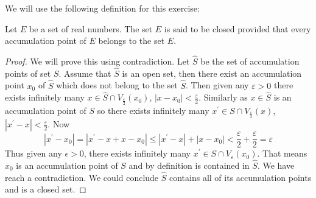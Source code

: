We will use the following definition for this exercise:
\begin{defi} Let \(E\) be a set of real numbers. The set \(E\) is said to be closed provided that every accumulation point of \(E\) belongs to the set \(E\).
\end{defi}
\begin{proof}
We will prove this using contradiction. Let \(\hat{S}\) be the set of accumulation points of set \(S\). Assume that \(\hat{S}\) is an open set, then there exist an accumulation point \(x_{0}\) of \(\hat{S}\) which does not belong to the set \(\hat{S}\). \newline
Then given any \(\varepsilon>0\) there exists infinitely many \(x \in \hat{S} \cap V_{\frac{\varepsilon}{2}}(x_0)\), \(\left|x-x_{0}\right|<\frac{\varepsilon}{2}\). Similarly as \(x \in \hat{S} \) is an accumulation point of \(S\) so there exists infinitely many \(x^{\prime} \in S \cap V_{\frac{\varepsilon}{2}}(x)\), \(\left|x^{\prime}-x\right|<\frac{\varepsilon}{2}\). Now
\[
\left|x^{\prime}-x_{0}\right|=\left|x^{\prime}-x+x-x_{0}\right| \leq\left|x^{\prime}-x\right|+\left|x-x_{0}\right|<\frac{\varepsilon}{2}+\frac{\varepsilon}{2}=\varepsilon 
\]
Thus given any \(\epsilon > 0\), there exists infinitely many  \(x^{\prime} \in S \cap V_{\varepsilon}(x_0)\). That means \(x_0\) is an accumulation point of \(S\) and by definition is contained in \(\hat{S}\). We have reach a contradiction. We could conclude \(\hat{S}\) contains all of its accumulation points and is a closed set.
\end{proof}
